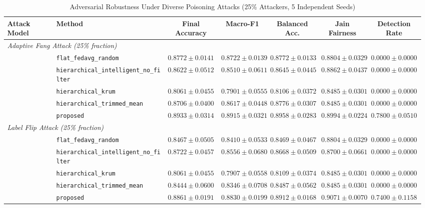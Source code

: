 \begin{table}[t]
\caption{Adversarial Robustness Under Diverse Poisoning Attacks (25\% Attackers, 5 Independent Seeds)}
\label{tab:results_attack}
\centering
\small
\begin{tabular}{llccccc}
\toprule
\textbf{Attack Model} & \textbf{Method} & \textbf{Final Accuracy} & \textbf{Macro-F1} & \textbf{Balanced Acc.} & \textbf{Jain Fairness} & \textbf{Detection Rate} \\
\midrule
\multicolumn{7}{l}{\textit{Adaptive Fang Attack (25\% fraction)}} \\
 & \texttt{flat\_fedavg\_random} & $0.8772 \pm 0.0141$ & $0.8722 \pm 0.0139$ & $0.8772 \pm 0.0133$ & $0.8804 \pm 0.0329$ & $0.0000 \pm 0.0000$ \\
 & \texttt{hierarchical\_intelligent\_no\_filter} & $0.8622 \pm 0.0512$ & $0.8510 \pm 0.0611$ & $0.8645 \pm 0.0445$ & $0.8862 \pm 0.0437$ & $0.0000 \pm 0.0000$ \\
 & \texttt{hierarchical\_krum} & $0.8061 \pm 0.0455$ & $0.7901 \pm 0.0555$ & $0.8106 \pm 0.0372$ & $0.8485 \pm 0.0301$ & $0.0000 \pm 0.0000$ \\
 & \texttt{hierarchical\_trimmed\_mean} & $0.8706 \pm 0.0400$ & $0.8617 \pm 0.0448$ & $0.8776 \pm 0.0307$ & $0.8485 \pm 0.0301$ & $0.0000 \pm 0.0000$ \\
 & \texttt{proposed} & $0.8933 \pm 0.0314$ & $0.8915 \pm 0.0321$ & $0.8958 \pm 0.0283$ & $0.8994 \pm 0.0224$ & $0.7800 \pm 0.0510$ \\
\midrule
\multicolumn{7}{l}{\textit{Label Flip Attack (25\% fraction)}} \\
 & \texttt{flat\_fedavg\_random} & $0.8467 \pm 0.0505$ & $0.8410 \pm 0.0533$ & $0.8469 \pm 0.0467$ & $0.8804 \pm 0.0329$ & $0.0000 \pm 0.0000$ \\
 & \texttt{hierarchical\_intelligent\_no\_filter} & $0.8722 \pm 0.0457$ & $0.8556 \pm 0.0680$ & $0.8668 \pm 0.0509$ & $0.8700 \pm 0.0661$ & $0.0000 \pm 0.0000$ \\
 & \texttt{hierarchical\_krum} & $0.8061 \pm 0.0455$ & $0.7907 \pm 0.0558$ & $0.8109 \pm 0.0374$ & $0.8485 \pm 0.0301$ & $0.0000 \pm 0.0000$ \\
 & \texttt{hierarchical\_trimmed\_mean} & $0.8444 \pm 0.0600$ & $0.8346 \pm 0.0708$ & $0.8487 \pm 0.0562$ & $0.8485 \pm 0.0301$ & $0.0000 \pm 0.0000$ \\
 & \texttt{proposed} & $0.8861 \pm 0.0191$ & $0.8830 \pm 0.0199$ & $0.8912 \pm 0.0168$ & $0.9071 \pm 0.0070$ & $0.7400 \pm 0.1158$ \\
\midrule

\end{tabular}
\end{table}
